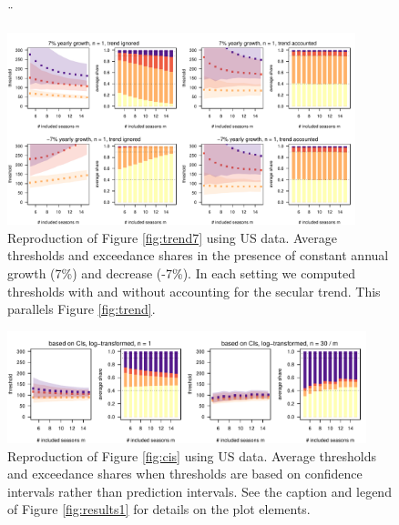 \documentclass[12pt]{article}
\begin{document}
\begin{figure}[h!]¨
\begin{center}
\includegraphics[width = 0.9\textwidth]{figure/plot_trend7_us_small.pdf}
\end{center}
\caption{Reproduction of Figure \ref{fig:trend7} using US data. Average thresholds and exceedance shares in the presence of constant annual growth (7\%) and decrease (-7\%). In each setting we computed thresholds with and without accounting for the secular trend. This parallels Figure \ref{fig:trend}.}
\label{fig:trend7_us}
\end{figure}


\newpage

\begin{figure}[h!]
\includegraphics[width=0.93\textwidth]{figure/plot_ci_us.pdf}
\caption{Reproduction of Figure \ref{fig:cis} using US data. Average thresholds and exceedance shares when thresholds are based on confidence intervals rather than prediction intervals. See the caption and legend of Figure \ref{fig:results1} for details on the plot elements.}
\label{fig:cis_us}
\end{figure}

\newpage
\end{document}
